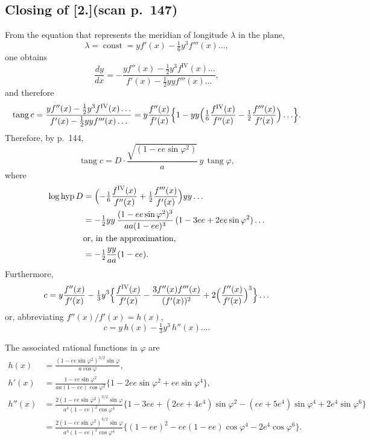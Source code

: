 \documentclass[12pt,a4paper]{article}
\newcommand{\tang}{\operatorname{tang}}
\newcommand{\loghyp}{\operatorname{log\,hyp}}
\DeclareMathOperator{\const}{const}
\begin{document}
\subsection*{Closing of [2.]\quad (scan p.~147)}

From the equation that represents the meridian of longitude $\lambda$
in the plane,
\[
   \lambda = \const = yf'(x) - \tfrac{1}{6}y^{3}f'''(x)\ldots,
\]
one obtains
\[
   \frac{dy}{dx} = -\frac{yf''(x)-\tfrac{1}{2}y^{3}f^{\mathrm{IV}}(x)\ldots}{f'(x)-\tfrac{1}{2}yyf'''(x)\ldots},
\]
and therefore
\[
   \tang c
     = \frac{yf''(x)-\tfrac{1}{2}y^{3}f^{\mathrm{IV}}(x)\ldots}{f'(x)-\tfrac{1}{2}yyf'''(x)\ldots}
     = y\frac{f''(x)}{f'(x)}\Bigl\{1-yy\Bigl(\tfrac{1}{6}\frac{f^{\mathrm{IV}}(x)}{f''(x)}
                                  -\tfrac{1}{2}\frac{f'''(x)}{f'(x)}\Bigr)\ldots\Bigr\}.
\]
Therefore, by p.~144,
\[
   \tang c = D\cdot\frac{\sqrt{(1-ee\sin\varphi^{2})}}{a}\,y\,\tang\varphi,
\]
where
\begin{align*}
   \loghyp D
     &= \Bigl(-\tfrac{1}{6}\frac{f^{\mathrm{IV}}(x)}{f''(x)}
                + \tfrac{1}{2}\frac{f'''(x)}{f'(x)}\Bigr)yy\ldots\\
     &= -\tfrac{1}{2}yy\,\frac{(1-ee\sin\varphi^{2})^{3}}{aa(1-ee)^{3}}\,
         (1-3ee+2ee\sin\varphi^{2})\ldots\\
     &\text{or, in the approximation,}\\
     &= -\tfrac{1}{2}\frac{yy}{aa}(1-ee).
\end{align*}
Furthermore,
\[
   c = y\frac{f''(x)}{f'(x)}
      - \tfrac{1}{3}y^{3}\Bigl\{\frac{f^{\mathrm{IV}}(x)}{f'(x)}
                                - \frac{3f''(x)f'''(x)}{(f'(x))^{2}}
                                + 2\Bigl(\frac{f''(x)}{f'(x)}\Bigr)^{3}\Bigr\}\ldots
\]
or, abbreviating $f''(x)/f'(x) = h(x)$,
\[
   c = y\,h(x) - \tfrac{1}{3}y^{3}\,h''(x)\ldots.
\]

The associated rational functions in $\varphi$ are
\begin{align*}
   h(x) &= \frac{(1-ee\sin\varphi^{2})^{3/2}\sin\varphi}{a\cos\varphi},\\[2pt]
   h'(x) &= \frac{1-ee\sin\varphi^{2}}{aa(1-ee)\cos\varphi^{2}}
              \bigl\{1-2ee\sin\varphi^{2}+ee\sin\varphi^{4}\bigr\},\\[2pt]
   h''(x) &= \frac{2(1-ee\sin\varphi^{2})^{3/2}\sin\varphi}{a^{3}(1-ee)^{2}\cos\varphi^{4}}
                \bigl\{1-3ee+(2ee+4e^{4})\sin\varphi^{2}
                        -(ee+5e^{4})\sin\varphi^{4}+2e^{4}\sin\varphi^{6}\bigr\}\\[1pt]
            &= \frac{2(1-ee\sin\varphi^{2})^{3/2}\sin\varphi}{a^{3}(1-ee)^{2}\cos\varphi^{4}}
                \bigl\{(1-ee)^{2}-ee(1-ee)\cos\varphi^{4}-2e^{4}\cos\varphi^{6}\bigr\}.
\end{align*}
\end{document}
